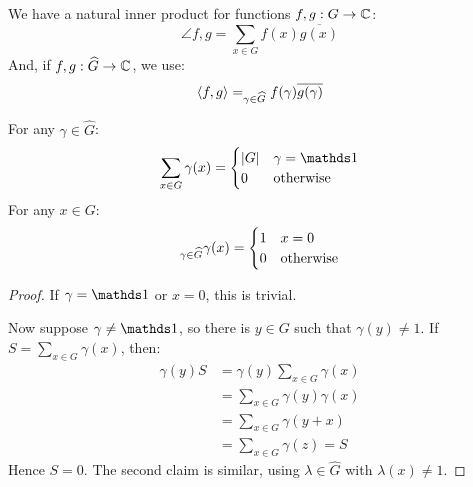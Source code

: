\documentclass[10pt,a4paper]{article}
\let\E\relax
\DeclareMathOperator*{\E}{\raisebox{-0.45em}{\text{\huge $\mathds{E}$}}}
\begin{document}
We have a natural inner product for functions $f,g:G\to \mathbb{C}$:
\[\angle{f, g} = \sum_{x \in G} f(x)\overline{g(x)}\]
And, if $f,g : \widehat{G} \to \mathbb{C}$, we use:
\[\angle{f,g} = \E_{\gamma \in \hat{G}} f(\gamma)\overline{g(\gamma)}\]
\begin{lemma}[Orthogonality]
  For any $\gamma \in \hat{G}$:
  \[\sum_{x \in G} \gamma(x) = \begin{cases} |G| & \gamma = \one \\ 0 & \ow\end{cases}\]
  For any $x \in G$:
  \[\E_{\gamma \in \hat{G}} \gamma(x) = \begin{cases} 1 & x = 0\\ 0 & \ow\end{cases}\]
\end{lemma}
\begin{proof}
  If $\gamma= \one$ or $x = 0$, this is trivial.

  Now suppose $\gamma \neq \one$, so there is $y \in G$ such that $\gamma(y) \neq 1$. If $S = \sum_{x\in G}\gamma(x)$, then:
  \begin{align*}
    \gamma(y)S &= \gamma(y)\sum_{x\in G} \gamma(x)\\
    &= \sum_{x \in G} \gamma(y)\gamma(x)\\
    &=  \sum_{x\in G} \gamma(y+x)\\
    &= \sum_{x\in G} \gamma(z) = S
  \end{align*}
  Hence $S = 0$. The second claim is similar, using $\lambda \in \hat{G}$ with $\lambda(x) \neq 1$.
\end{proof}
\end{document}
